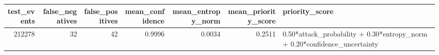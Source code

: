 \begin{tabular}{rrrrrrl}
\toprule
test_events & false_negatives & false_positives & mean_confidence & mean_entropy_norm & mean_priority_score & priority_score \\
\midrule
212278 & 32 & 42 & 0.9996 & 0.0034 & 0.2511 & 0.50*attack_probability + 0.30*entropy_norm + 0.20*confidence_uncertainty \\
\bottomrule
\end{tabular}
